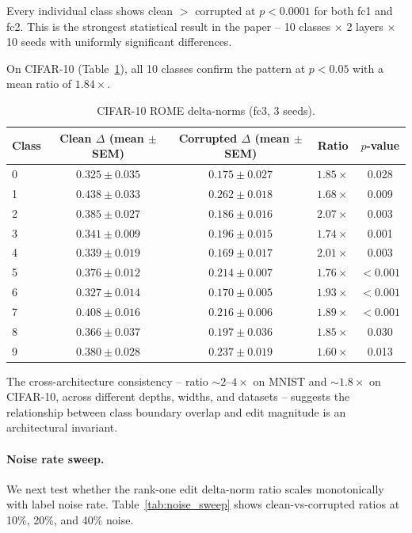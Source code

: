 \documentclass{article}
\begin{document}
Every individual class shows clean $>$ corrupted at $p<0.0001$ for both fc1 and fc2. This is the strongest statistical result in the paper -- 10 classes $\times$ 2 layers $\times$ 10 seeds with uniformly significant differences.

On CIFAR-10 (Table~\ref{tab:rome_cifar}), all 10 classes confirm the pattern at $p<0.05$ with a mean ratio of $1.84\times$.

\begin{table}[t]
  \centering
  \caption{CIFAR-10 ROME delta-norms (fc3, 3 seeds).}
  \label{tab:rome_cifar}
  \begin{tabular}{lcccc}
    \toprule
    Class & Clean $\Delta$ (mean $\pm$ SEM) & Corrupted $\Delta$ (mean $\pm$ SEM) & Ratio & $p$-value \\
    \midrule
    0 & $0.325 \pm 0.035$ & $0.175 \pm 0.027$ & $1.85\times$ & 0.028 \\
    1 & $0.438 \pm 0.033$ & $0.262 \pm 0.018$ & $1.68\times$ & 0.009 \\
    2 & $0.385 \pm 0.027$ & $0.186 \pm 0.016$ & $2.07\times$ & 0.003 \\
    3 & $0.341 \pm 0.009$ & $0.196 \pm 0.015$ & $1.74\times$ & 0.001 \\
    4 & $0.339 \pm 0.019$ & $0.169 \pm 0.017$ & $2.01\times$ & 0.003 \\
    5 & $0.376 \pm 0.012$ & $0.214 \pm 0.007$ & $1.76\times$ & $<0.001$ \\
    6 & $0.327 \pm 0.014$ & $0.170 \pm 0.005$ & $1.93\times$ & $<0.001$ \\
    7 & $0.408 \pm 0.016$ & $0.216 \pm 0.006$ & $1.89\times$ & $<0.001$ \\
    8 & $0.366 \pm 0.037$ & $0.197 \pm 0.036$ & $1.85\times$ & 0.030 \\
    9 & $0.380 \pm 0.028$ & $0.237 \pm 0.019$ & $1.60\times$ & 0.013 \\
    \bottomrule
  \end{tabular}
\end{table}

The cross-architecture consistency -- ratio $\sim2$--$4\times$ on MNIST and $\sim1.8\times$ on CIFAR-10, across different depths, widths, and datasets -- suggests the relationship between class boundary overlap and edit magnitude is an architectural invariant.

\paragraph{Noise rate sweep.} We next test whether the rank-one edit delta-norm ratio scales monotonically with label noise rate. Table~\ref{tab:noise_sweep} shows clean-vs-corrupted ratios at 10\%, 20\%, and 40\% noise.
\end{document}
